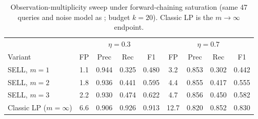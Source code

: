 \begin{table}[t]
\centering
\caption{Observation-multiplicity sweep under forward-chaining saturation
(same 47 queries and noise model as ; budget $k{=}20$).
Classic LP is the $m{\to}\infty$ endpoint.}
\label{tab:multiplicity}
\small
\begin{tabular}{l|cccc|cccc}
\toprule
& \multicolumn{4}{c|}{$\eta=0.3$} & \multicolumn{4}{c}{$\eta=0.7$} \\
Variant & FP & Prec & Rec & F1 & FP & Prec & Rec & F1 \\
\midrule
SELL, $m{=}1$ & 1.1 & 0.944 & 0.325 & 0.480 & 3.2 & 0.853 & 0.302 & 0.442 \\
SELL, $m{=}2$ & 1.8 & 0.936 & 0.441 & 0.595 & 4.4 & 0.855 & 0.417 & 0.555 \\
SELL, $m{=}3$ & 2.2 & 0.930 & 0.474 & 0.622 & 4.7 & 0.856 & 0.450 & 0.582 \\
Classic LP ($m{=}\infty$) & 6.6 & 0.906 & 0.926 & 0.913 & 12.7 & 0.820 & 0.852 & 0.830 \\
\bottomrule
\end{tabular}
\end{table}
